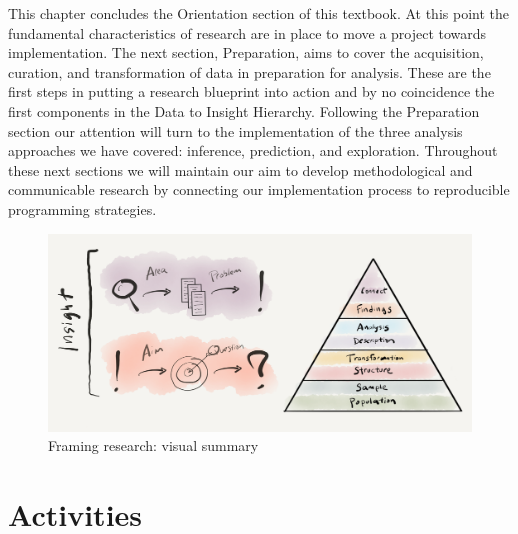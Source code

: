 \documentclass[
  letterpaper,
]{latex/krantz}
\begin{document}
This chapter concludes the Orientation section of this textbook. At this
point the fundamental characteristics of research are in place to move a
project towards implementation. The next section, Preparation, aims to
cover the acquisition, curation, and transformation of data in
preparation for analysis. These are the first steps in putting a
research blueprint into action and by no coincidence the first
components in the Data to Insight Hierarchy. Following the Preparation
section our attention will turn to the implementation of the three
analysis approaches we have covered: inference, prediction, and
exploration. Throughout these next sections we will maintain our aim to
develop methodological and communicable research by connecting our
implementation process to reproducible programming strategies.

\begin{figure}[h]

{\centering \includegraphics[width=6.98in,height=\textheight]{figures/framing-research/framing-research-visual-summary.png}

}

\caption{\label{fig-framing-research-visual-summary-graphic}Framing
research: visual summary}

\end{figure}

\hypertarget{activities-3}{%
\section*{Activities}\label{activities-3}}

\end{document}
